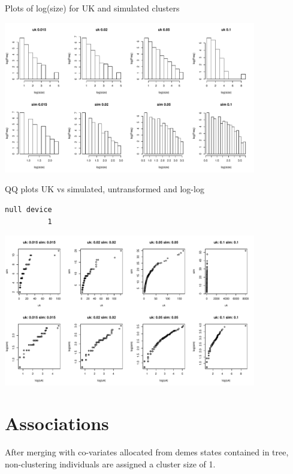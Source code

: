 \documentclass[]{revtex4}\usepackage[]{graphicx}\usepackage[]{color}
\makeatletter
\newenvironment{kframe}{%
 \def\at@end@of@kframe{}%
 \ifinner\ifhmode%
  \def\at@end@of@kframe{\end{minipage}}%
  \begin{minipage}{\columnwidth}%
 \fi\fi%
 \def\FrameCommand##1{\hskip\@totalleftmargin \hskip-\fboxsep
 \colorbox{shadecolor}{##1}\hskip-\fboxsep
     \hskip-\linewidth \hskip-\@totalleftmargin \hskip\columnwidth}%
 \MakeFramed {\advance\hsize-\width
   \@totalleftmargin\z@ \linewidth\hsize
   \@setminipage}}%
 {\par\unskip\endMakeFramed%
 \at@end@of@kframe}
\newenvironment{knitrout}{}{} %
\makeatother
\begin{document}
Plots of log(size) for UK and simulated clusters
\begin{knitrout}
\color{fgcolor}

{\centering \includegraphics[width=11cm]{figure/plotplot_log-log-1} 

}



\end{knitrout}

QQ plots UK vs simulated, untransformed and log-log
\begin{knitrout}
\color{fgcolor}\begin{kframe}
\begin{verbatim}
null device 
          1 
\end{verbatim}
\end{kframe}

{\centering \includegraphics[width=11cm]{figure/plotQQ_plot-1} 

}



\end{knitrout}

\section{Associations}
After merging with co-variates allocated from demes states contained in tree, non-clustering individuals are assigned a cluster size of 1. 
\end{document}
